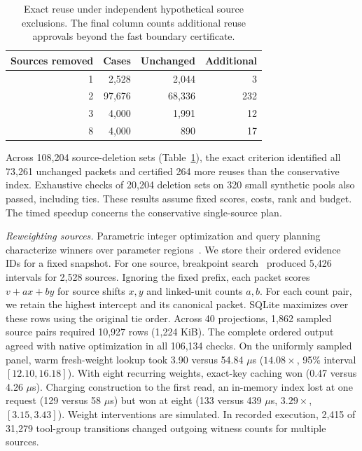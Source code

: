 \documentclass[conference]{IEEEtran}
\begin{document}
\balance
\begin{table}[t]
\caption{Exact reuse under independent hypothetical source exclusions. The final column counts additional reuse approvals beyond the fast boundary certificate.}
\centering\small
\begin{tabular}{rrrr}\toprule
Sources removed & Cases & Unchanged & Additional\\\midrule
1 & 2,528 & 2,044 & 3\\
2 & 97,676 & 68,336 & 232\\
3 & 4,000 & 1,991 & 12\\
8 & 4,000 & 890 & 17\\
\bottomrule\end{tabular}
\label{tab:exclusions}
\end{table}

Across 108,204 source-deletion sets (Table~\ref{tab:exclusions}), the exact criterion identified all 73,261 unchanged packets and certified 264 more reuses than the conservative index. Exhaustive checks of 20,204 deletion sets on 320 small synthetic pools also passed, including ties. These results assume fixed scores, costs, rank and budget. The timed speedup concerns the conservative single-source plan.

\noindent\textit{Reweighting sources.} Parametric integer optimization and query planning characterize winners over parameter regions~\cite{crema,ganguly}. We store their ordered evidence IDs for a fixed snapshot. For one source, breakpoint search~\cite{eisner} produced 5,426 intervals for 2,528 sources. Ignoring the fixed prefix, each packet scores $v+ax+by$ for source shifts $x,y$ and linked-unit counts $a,b$. For each count pair, we retain the highest intercept and its canonical packet. SQLite maximizes over these rows using the original tie order. Across 40 projections, 1,862 sampled source pairs required 10,927 rows (1,224 KiB). The complete ordered output agreed with native optimization in all 106,134 checks. On the uniformly sampled panel, warm fresh-weight lookup took 3.90 versus 54.84 $\mu$s ($14.08\times$, 95\% interval $[12.10,16.18]$). With eight recurring weights, exact-key caching won (0.47 versus 4.26 $\mu$s). Charging construction to the first read, an in-memory index lost at one request (129 versus 58 $\mu$s) but won at eight (133 versus 439 $\mu$s, $3.29\times$, $[3.15,3.43]$). Weight interventions are simulated. In recorded execution, 2,415 of 31,279 tool-group transitions changed outgoing witness counts for multiple sources.
\end{document}

